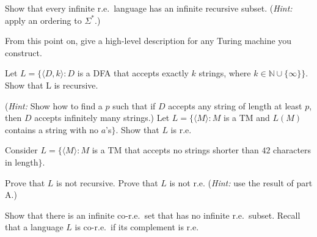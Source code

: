 \documentclass[letterpaper, ps]{cs121}
\begin{document}


\problem{}

Show that every infinite r.e.~language has an infinite recursive subset. (\emph{Hint:} apply an ordering to $\Sigma^*$.)



\problem{}

From this point on, give a high-level description for any Turing machine you construct.

\subproblem Let $L=\{\langle D,k\rangle:D$ is a DFA that accepts exactly $k$ strings, where $k\in\mathbb{N}\cup\{\infty\}\}$. Show that L is recursive.

(\emph{Hint:} Show how to find a $p$ such that if $D$ accepts any string of length at least $p$, then $D$ accepts infinitely many strings.)
\subproblem Let $L=\{\langle M\rangle:M$ is a TM and $L(M)$ contains a string with no $a$'s$\}$. Show that $L$ is r.e.




\problem{}

Consider $L=\{\langle M\rangle:M$ is a TM that accepts no strings shorter than $42$ characters in length$\}$.

\subproblem Prove that $L$ is not recursive.
\subproblem Prove that $L$ is not r.e. (\emph{Hint:} use the result of part A.)




Show that there is an infinite co-r.e.~set that has no infinite r.e.~subset. Recall that a language $L$ is co-r.e.~if its complement is r.e.


\end{document}
